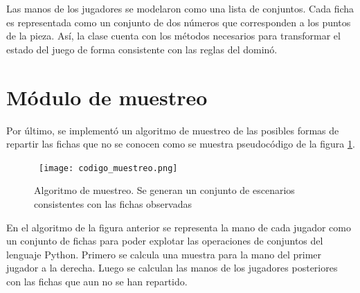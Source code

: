 Las manos de los jugadores se modelaron como una lista de conjuntos. Cada ficha
es representada como un conjunto de dos números que corresponden a los puntos de
la pieza. Así, la clase cuenta con los métodos necesarios para transformar el
estado del juego de forma consistente con las reglas del dominó.

\section{Módulo de muestreo}

Por último, se implementó un algoritmo de muestreo de las posibles formas de
repartir las fichas que no se conocen como se muestra pseudocódigo de la figura
\ref{CM}.

\begin{figure}[ht]
   \begin{center}
      \hbox{\hspace{-1.5em} \texttt{[image: codigo\_muestreo.png]}}
      \caption{Algoritmo de muestreo. Se generan un conjunto de escenarios consistentes con las fichas observadas}
      \label{CM}
   \end{center}
\end{figure}

En el algoritmo de la figura anterior se representa la mano de cada jugador como
un conjunto de fichas para poder explotar las operaciones de conjuntos del
lenguaje Python. Primero se calcula una muestra para la mano del primer jugador
a la derecha. Luego se calculan las manos de los jugadores posteriores con las
fichas que aun no se han repartido.



